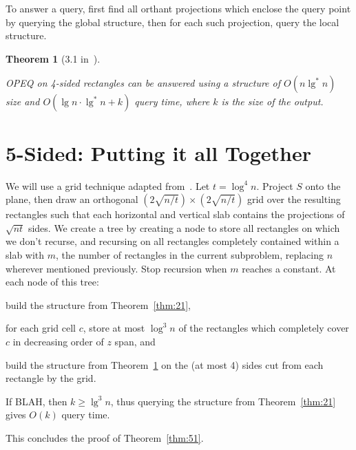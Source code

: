 \documentclass[letterpaper,12pt,twocolumn]{article}
\newcommand{\BigOh}[1]{O\!\left(#1\right)}
\theoremstyle{plain}
\newtheorem{theorem}{Theorem}
\begin{document}
To answer a query, first find all orthant projections which enclose
the query point by querying the global structure, then for each such
projection, query the local structure.

\begin{theorem}[3.1 in~\cite{saladi2015improved}]\label{thm:31}

  OPEQ on 4-sided rectangles can be answered using a structure of
  $\BigOh{n\lg^* n}$ size and $\BigOh{\lg n \cdot \lg^* n + k}$
  query time, where $k$ is the size of the output.

\end{theorem}

\section{5-Sided: Putting it all Together}

We will use a grid technique adapted from~\cite{alstrup2000new}.  Let
$t = \log^4 n$.  Project $S$ onto the plane, then draw an orthogonal
$(2\sqrt{n/t})\times(2\sqrt{n/t})$ grid over the resulting rectangles
such that each horizontal and vertical slab contains the projections
of $\sqrt{nt}$ sides.  We create a tree by creating a node to store
all rectangles on which we don't recurse, and recursing on all
rectangles completely contained within a slab with $m$, the number of
rectangles in the current subproblem, replacing $n$ wherever mentioned
previously.  Stop recursion when $m$ reaches a constant.  At each node
of this tree:
%
\begin{enumerate*}[label=(\roman*)] %
\item build the structure from Theorem~\ref{thm:21},
\item for each grid cell $c$, store at most $\log^3 n$ of the
  rectangles which completely cover $c$ in decreasing order of $z$
  span, and
\item build the structure from Theorem~\ref{thm:31} on the (at most 4)
  sides cut from each rectangle by the grid.
\end{enumerate*}

If BLAH, then $k \ge \lg^3 n$, thus querying the structure from
Theorem~\ref{thm:21} gives $\BigOh{k}$ query time.

This concludes the proof of Theorem~\ref{thm:51}.



\end{document}
